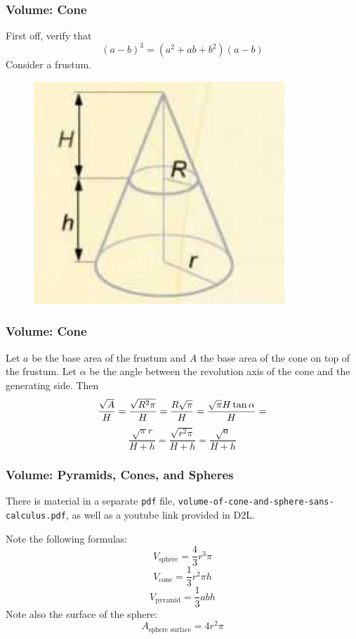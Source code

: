 \documentclass[xcolor=dvipsnames]{beamer}
\begin{document}
\begin{frame}
  \frametitle{Volume: Cone}
  First off, verify that
  \begin{equation}
    \label{eq:oeveezee}
    (a-b)^{3}=(a^{2}+ab+b^{2})(a-b)
  \end{equation}
Consider a frustum. 
  \begin{figure}[h]
    \includegraphics[scale=.5]{./frustum.png}
  \end{figure}
\end{frame}

\begin{frame}
  \frametitle{Volume: Cone}
Let $a$ be the base area of the frustum and $A$ the base area of the
cone on top of the frustum. Let $\alpha$ be the angle between the
revolution axis of the cone and the generating side. Then
\begin{equation}
  \label{eq:aroowiej}
  \frac{\sqrt{A}}{H}=\frac{\sqrt{R^{2}\pi}}{H}=\frac{R\sqrt{\pi}}{H}=\frac{\sqrt{\pi}H\tan\alpha}{H}=\notag
\end{equation}
\begin{equation}
  \label{eq:hopeexee}
  \frac{\sqrt{\pi}r}{H+h}=\frac{\sqrt{r^{2}\pi}}{H+h}=\frac{\sqrt{a}}{H+h}
\end{equation}
\end{frame}

\begin{frame}
  \frametitle{Volume: Pyramids, Cones, and Spheres}
  There is material in a separate \texttt{pdf} file,
  \texttt{volume-of-cone-and-sphere-sans-calculus.pdf}, as well as a
  youtube link provided in D2L.


Note the following formulas:
\begin{equation}
  \label{eq:joyakuap}
  V_{\mbox{sphere}}=\frac{4}{3}r^{3}\pi
\end{equation}
\begin{equation}
  \label{eq:ahquieye}
  V_{\mbox{cone}}=\frac{1}{3}r^{2}\pi{}h
\end{equation}
\begin{equation}
  \label{eq:kooshogu}
  V_{\mbox{pyramid}}=\frac{1}{3}abh
\end{equation}
Note also the surface of the sphere:
\begin{equation}
  \label{eq:aighaing}
  A_{\mbox{sphere surface}}=4r^{2}\pi
\end{equation}
\end{frame}
\end{document}
